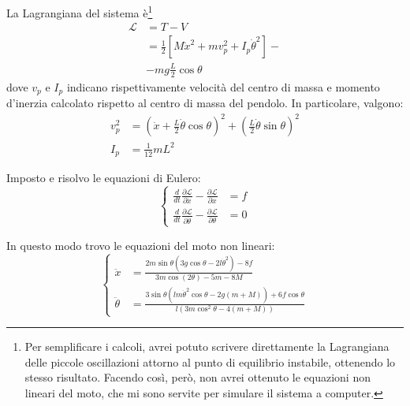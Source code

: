 La Lagrangiana del sistema è\footnote{Per semplificare i calcoli, avrei potuto scrivere direttamente la Lagrangiana delle
piccole oscillazioni attorno al punto di equilibrio instabile, ottenendo lo stesso risultato. Facendo così, però, non avrei
ottenuto le equazioni non lineari del moto, che mi sono servite per simulare il sistema a computer.}
\begin{equation}
  \begin{aligned}
    \mathcal L &= T - V\\
      &= \frac 1 2 \left[
        M \dot x^2 + mv_{p}^2 + I_{p} \dot \theta^2
      \right] -\\
      &- mg\frac L 2\cos{\theta}
    \end{aligned}
  \label{eq:lagrangiana}
\end{equation}
dove $v_p$ e $I_p$ indicano rispettivamente velocità del centro di massa e momento d'inerzia calcolato rispetto al
centro di massa del pendolo.
In particolare, valgono:
\begin{equation}
  \begin{aligned}
    v_p^2 &= \left(\dot x + \frac L 2 \dot \theta \cos{\theta}\right)^2 + \left(\frac L 2 \dot \theta \sin{\theta}\right)^2 \\
    I_p &= \frac 1 {12} m L^2
  \end{aligned}
  \label{eq:lagrangiana-2}
\end{equation}

Imposto e risolvo le equazioni di Eulero:
\begin{equation}
  \left\{
    \begin{aligned}
      \frac d {dt} \frac {\partial \mathcal L} {\partial \dot x } - \frac {\partial \mathcal L} {\partial  x}&= f \\
      \frac d {dt} \frac {\partial \mathcal L} {\partial \dot \theta } - \frac {\partial \mathcal L} {\partial \theta}&= 0
    \end{aligned}
  \right.
  \label{eq:eulero}
\end{equation}

In questo modo trovo le equazioni del moto non lineari:
\begin{equation}
  \left\{
  \begin{aligned}
    \ddot x &= \frac{2m\sin\theta\left(3g\cos\theta-2l\dot \theta^2\right)-8f}{3m\cos(2\theta)-5m-8M} \\
    \ddot \theta &= \frac{3\sin\theta \left(lm\dot \theta^2\cos\theta-2g(m+M)\right)+6f\cos\theta}{l\left(3m\cos^2\theta-4(m+M)\right)}
  \end{aligned}
  \right.
  \label{eq:moto}
\end{equation}

